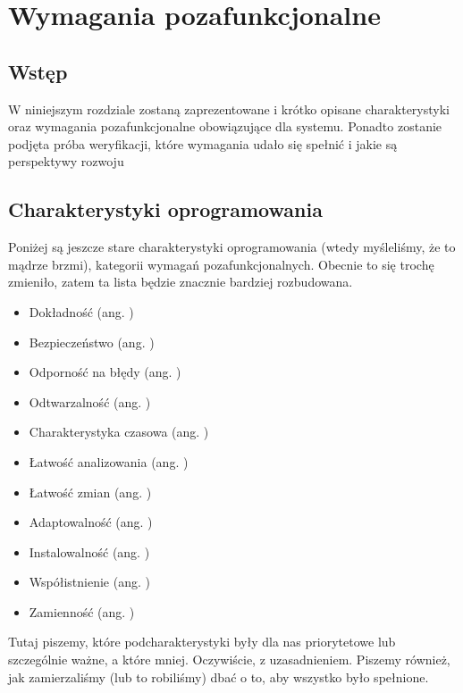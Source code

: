 \chapter{Wymagania pozafunkcjonalne}
\label{Chapter4}

\section{Wstęp}
\label{Chapter41}

W niniejszym rozdziale zostaną zaprezentowane i krótko opisane charakterystyki oraz wymagania pozafunkcjonalne obowiązujące dla systemu. Ponadto zostanie podjęta próba weryfikacji, które wymagania udało się spełnić i jakie są perspektywy rozwoju

\section{Charakterystyki oprogramowania}

Poniżej są jeszcze stare charakterystyki oprogramowania (wtedy myśleliśmy, że to mądrze brzmi), kategorii wymagań pozafunkcjonalnych. Obecnie to się trochę zmieniło, zatem ta lista będzie znacznie bardziej rozbudowana.

\begin{itemize}
\item Dokładność (ang. )
\item Bezpieczeństwo (ang. )
\item Odporność na błędy (ang. )
\item Odtwarzalność (ang. )
\item Charakterystyka czasowa (ang. )
\item Łatwość analizowania (ang. )
\item Łatwość zmian (ang. )
\item Adaptowalność (ang. )
\item Instalowalność (ang. )
\item Współistnienie (ang. )
\item Zamienność (ang. )
\end{itemize}

Tutaj piszemy, które podcharakterystyki były dla nas priorytetowe lub szczególnie ważne, a które mniej. Oczywiście, z uzasadnieniem. Piszemy również, jak zamierzaliśmy (lub to robiliśmy) dbać o to, aby wszystko było spełnione.

